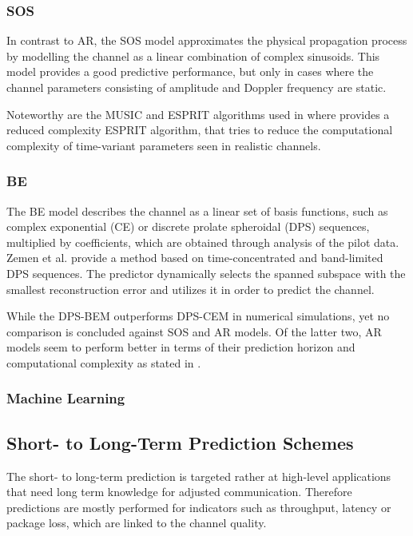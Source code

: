 \documentclass{IEEEtran}
\begin{document}
\subsubsection{SOS}
In contrast to AR, the SOS model approximates the physical propagation process by modelling the channel as a linear combination of complex sinusoids. This model provides a good predictive performance, but only in cases where the channel parameters consisting of amplitude and Doppler frequency are static.

Noteworthy are the MUSIC and ESPRIT algorithms used in \cite{wongWLC435LowComplexityAdaptive2006,wongJointChannelEstimation2005,semmelrodtInvestigationDifferentFading2003,tealSimulationPerformanceBounds2001,vaughanShorttermMobileChannel2000,chenNewApproachesChannel2006} where \cite{wongWLC435LowComplexityAdaptive2006} provides a reduced complexity ESPRIT algorithm, that tries to reduce the computational complexity of time-variant parameters seen in realistic channels.

\subsubsection{BE}
The BE model describes the channel as a linear set of basis functions, such as complex exponential (CE) or discrete prolate spheroidal (DPS) sequences, multiplied by coefficients, which are obtained through analysis of the pilot data. Zemen et al. \cite{zemenMinimumEnergyBandLimitedPredictor2007} provide a method based on time-concentrated and band-limited DPS sequences. The predictor dynamically selects the spanned subspace with the smallest reconstruction error and utilizes it in order to predict the channel.


While the DPS-BEM outperforms DPS-CEM in numerical simulations, yet no comparison is concluded against SOS and AR models. Of the latter two, AR models seem to perform better in terms of their prediction horizon and computational complexity as stated in \cite{semmelrodtInvestigationDifferentFading2003}.

\subsubsection{Machine Learning}
\subsection{Short- to Long-Term Prediction Schemes}


The short- to long-term prediction is targeted rather at high-level applications that need long term knowledge for adjusted communication. Therefore predictions are mostly performed for indicators such as throughput, latency or package loss, which are linked to the channel quality.
\end{document}

